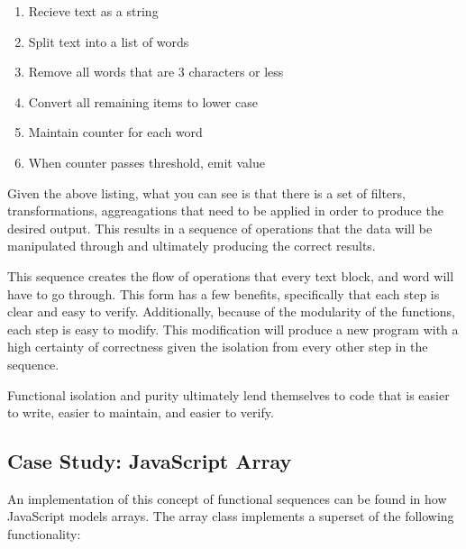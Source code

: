 \documentclass{article}
\begin{document}
\begin{enumerate}
  \item Recieve text as a string
  \item Split text into a list of words
  \item Remove all words that are 3 characters or less
  \item Convert all remaining items to lower case
  \item Maintain counter for each word 
  \item When counter passes threshold, emit value
\end{enumerate}

Given the above listing, what you can see is that there is a set of filters, transformations, aggreagations that need to be applied in order to produce the desired output.  This results in a sequence of operations that the data will be manipulated through and ultimately producing the correct results.  

This sequence creates the flow of operations that every text block, and word will have to go through.  This form has a few benefits, specifically that each step is clear and easy to verify.  Additionally, because of the modularity of the functions, each step is easy to modify.  This modification will produce a new program with a high certainty of correctness given the isolation from every other step in the sequence.  

Functional isolation and purity ultimately lend themselves to code that is easier to write, easier to maintain, and easier to verify.  

\subsection{Case Study: JavaScript Array}

An implementation of this concept of functional sequences can be found in how JavaScript models arrays.  The array class implements a superset of the following functionality:
\end{document}
